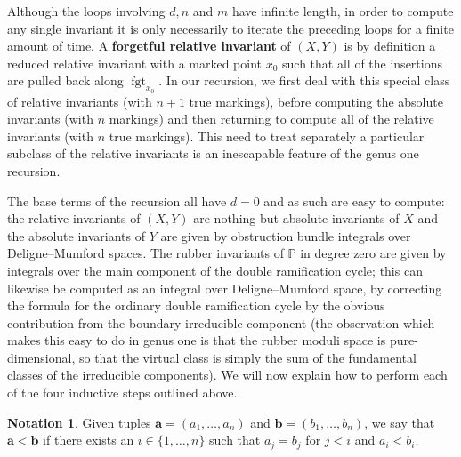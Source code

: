 \documentclass[11pt]{amsart}
\newcommand{\fgt}{\operatorname{fgt}}
\theoremstyle{definition}
\newtheorem{notation}[thm]{Notation}
\theoremstyle{definition}
\begin{document}
\begin{algorithm}
\DontPrintSemicolon
{}
\end{algorithm}
\noindent Although the loops involving $d, n$ and $m$ have infinite length, in order to compute any single invariant it is only necessarily to iterate the preceding loops for a finite amount of time. A \textbf{forgetful relative invariant} of $(X,Y)$ is by definition a reduced relative invariant with a marked point $x_0$ such that all of the insertions are pulled back along $\fgt_{x_0}$. In our recursion, we first deal with this special class of relative invariants (with $n+1$ true markings), before computing the absolute invariants (with $n$ markings) and then returning to compute all of the relative invariants (with $n$ true markings). This need to treat separately a particular subclass of the relative invariants is an inescapable feature of the genus one recursion.

The base terms of the recursion all have $d=0$ and as such are easy to compute: the relative invariants of $(X,Y)$ are nothing but absolute invariants of $X$ and the absolute invariants of $Y$ are given by obstruction bundle integrals over Deligne--Mumford spaces. The rubber invariants of $\mathbb{P}$ in degree zero are given by integrals over the main component of the double ramification cycle; this can likewise be computed as an integral over Deligne--Mumford space, by correcting the formula for the ordinary double ramification cycle \cite{Hain,JPPZ} by the obvious contribution from the boundary irreducible component (the observation which makes this easy to do in genus one is that the rubber moduli space is pure-dimensional, so that the virtual class is simply the sum of the fundamental classes of the irreducible components). We will now explain how to perform each of the four inductive steps outlined above.

\begin{notation}Given tuples $\mathbf{a}=(a_1,\ldots,a_n)$ and $\mathbf{b}=(b_1,\ldots,b_n)$, we say that $\mathbf{a}<\mathbf{b}$ if there exists an $i \in \{1,\ldots,n\}$ such that $a_j = b_j$ for $j < i$ and $a_i < b_i$.\end{notation}
\end{document}
